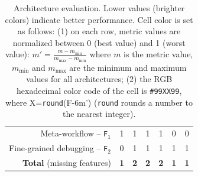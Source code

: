 \documentclass[preprint,3p,twocolumn]{elsarticle}
\newcommand{\correction}[1]{\color{blue}#1\color{black}\xspace}
\begin{document}
\begin{table}
\begin{tabular}{rcccccc}
  Meta-workflow  -- \texttt{\correction{F}$_1$}    & \cellcolor[HTML]{999999}1
                                     & \cellcolor[HTML]{999999}1
                                     & \cellcolor[HTML]{99FF99}\correction{1}
                                     & \cellcolor[HTML]{999999}1
                                     & \cellcolor[HTML]{99FF99}0
                                     & \cellcolor[HTML]{99FF99}0\\
  Fine-grained debugging -- \texttt{\correction{F}$_2$}   & \cellcolor[HTML]{99FF99}0
                                     & \cellcolor[HTML]{999999}1
                                     & \cellcolor[HTML]{999999}1
                                     & \cellcolor[HTML]{999999}1
                                     & \cellcolor[HTML]{999999}1
                                     & \cellcolor[HTML]{999999}1\\
  \textbf{Total} (missing features) & \cellcolor[HTML]{99FF99}\textbf{1}
                                     & \cellcolor[HTML]{999999}\textbf{2}
                                     & \cellcolor[HTML]{99FF99}\textbf{\correction{2}}
                                     & \cellcolor[HTML]{999999}\textbf{2}
                                     & \cellcolor[HTML]{99FF99}\textbf{1}
                                     & \cellcolor[HTML]{99FF99}\textbf{1}\\
\end{tabular}

\caption{Architecture evaluation. Lower values (brighter colors) indicate better performance. Cell color is set as follows: (1) on each row, metric values are
  normalized between 0 (best value) and 1 (worst value):
  $m'=\frac{m-m_{\mathrm{min}}}{m_{\mathrm{max}}-m_{\mathrm{min}}}$ where
  $m$ is the metric value, $m_{\mathrm{min}}$ and $m_{\mathrm{max}}$
  are the minimum and maximum values for all architectures; (2) the RGB hexadecimal color code of the cell
  is \texttt{\#99XX99}, where X=\texttt{round}(F-6m') (\texttt{round} rounds a number to the nearest integer). }
\label{table:evaluation}
\end{table}
\end{document}
